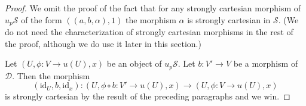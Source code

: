 \documentclass{stacks-project}
\theoremstyle{plain}
\theoremstyle{definition}
\theoremstyle{remark}
\numberwithin{equation}{subsection}
\begin{document}
\begin{proof}
\medskip\noindent
We omit the proof of the fact that for any strongly cartesian morphism
of $u_p\mathcal{S}$ of the form $((a, b, \alpha), 1)$ the morphism
$\alpha$ is strongly cartesian in $\mathcal{S}$.
(We do not need the characterization of strongly cartesian morphisms
in the rest of the proof, although we do use it later in this section.)

\medskip\noindent
Let $(U, \phi : V \to u(U), x)$ be an object of $u_p\mathcal{S}$.
Let $b : V' \to V$ be a morphism of $\mathcal{D}$. Then the morphism
$$
(\text{id}_U, b, \text{id}_x) :
(U, \phi \circ b : V' \to u(U), x)
\longrightarrow
(U, \phi : V \to u(U), x)
$$
is strongly cartesian by the result of the preceding paragraphs and we win.
\end{proof}
\end{document}
